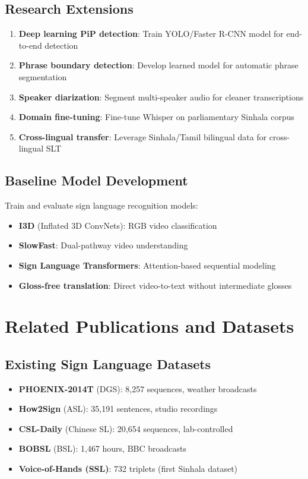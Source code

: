 \documentclass[11pt,a4paper]{article}
\begin{document}
\subsection{Research Extensions}

\begin{enumerate}
    \item \textbf{Deep learning PiP detection}: Train YOLO/Faster R-CNN model for end-to-end detection
    \item \textbf{Phrase boundary detection}: Develop learned model for automatic phrase segmentation
    \item \textbf{Speaker diarization}: Segment multi-speaker audio for cleaner transcriptions
    \item \textbf{Domain fine-tuning}: Fine-tune Whisper on parliamentary Sinhala corpus
    \item \textbf{Cross-lingual transfer}: Leverage Sinhala/Tamil bilingual data for cross-lingual SLT
\end{enumerate}

\subsection{Baseline Model Development}

Train and evaluate sign language recognition models:
\begin{itemize}
    \item \textbf{I3D} (Inflated 3D ConvNets): RGB video classification
    \item \textbf{SlowFast}: Dual-pathway video understanding
    \item \textbf{Sign Language Transformers}: Attention-based sequential modeling
    \item \textbf{Gloss-free translation}: Direct video-to-text without intermediate glosses
\end{itemize}

\section{Related Publications and Datasets}

\subsection{Existing Sign Language Datasets}

\begin{itemize}
    \item \textbf{PHOENIX-2014T} (DGS): 8,257 sequences, weather broadcasts
    \item \textbf{How2Sign} (ASL): 35,191 sentences, studio recordings
    \item \textbf{CSL-Daily} (Chinese SL): 20,654 sequences, lab-controlled
    \item \textbf{BOBSL} (BSL): 1,467 hours, BBC broadcasts
    \item \textbf{Voice-of-Hands (SSL)}: 732 triplets (first Sinhala dataset)
\end{itemize}
\end{document}
